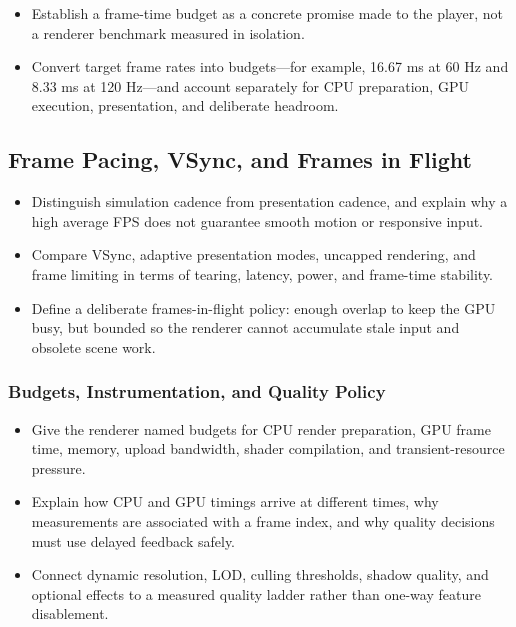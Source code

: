 \documentclass[
  11pt,
  letterpaper,
  DIV=11,
  numbers=noendperiod,
  twoside,
  open=right]{scrreprt}
\providecommand{\tightlist}{%
  \setlength{\itemsep}{0pt}\setlength{\parskip}{0pt}}
\begin{document}
\begin{itemize}
\tightlist
\item
  Establish a frame-time budget as a concrete promise made to the
  player, not a renderer benchmark measured in isolation.
\item
  Convert target frame rates into budgets---for example, 16.67 ms at 60
  Hz and 8.33 ms at 120 Hz---and account separately for CPU preparation,
  GPU execution, presentation, and deliberate headroom.
\end{itemize}

\subsection{Frame Pacing, VSync, and Frames in
Flight}\label{frame-pacing-vsync-and-frames-in-flight}

\begin{itemize}
\tightlist
\item
  Distinguish simulation cadence from presentation cadence, and explain
  why a high average FPS does not guarantee smooth motion or responsive
  input.
\item
  Compare VSync, adaptive presentation modes, uncapped rendering, and
  frame limiting in terms of tearing, latency, power, and frame-time
  stability.
\item
  Define a deliberate frames-in-flight policy: enough overlap to keep
  the GPU busy, but bounded so the renderer cannot accumulate stale
  input and obsolete scene work.
\end{itemize}

\subsubsection{Budgets, Instrumentation, and Quality
Policy}\label{budgets-instrumentation-and-quality-policy}

\begin{itemize}
\tightlist
\item
  Give the renderer named budgets for CPU render preparation, GPU frame
  time, memory, upload bandwidth, shader compilation, and
  transient-resource pressure.
\item
  Explain how CPU and GPU timings arrive at different times, why
  measurements are associated with a frame index, and why quality
  decisions must use delayed feedback safely.
\item
  Connect dynamic resolution, LOD, culling thresholds, shadow quality,
  and optional effects to a measured quality ladder rather than one-way
  feature disablement.
\end{itemize}
\end{document}
